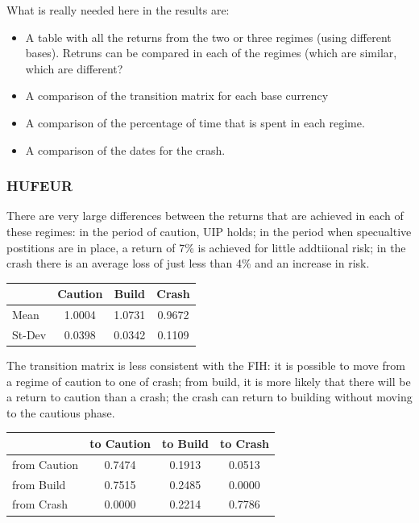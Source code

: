 \documentclass[12pt, a4paper, oneside]{article} %
\begin{document}
What is really needed here in the results are:
\begin{itemize}
\item A table with all the returns from the two or three regimes (using different bases).  Retruns can be compared in each of the regimes (which are similar, which are different? 
\item A comparison of the transition matrix for each base currency
\item A comparison of the percentage of time that is spent in each regime. 
\item A comparison of the dates for the crash. 
\end{itemize}
 
  
\subsubsection{HUFEUR}
There are very large differences between the returns that are achieved in each of these regimes: in the period of caution, UIP holds; in the period when specualtive postitions are in place, a return of 7\% is achieved for little addtiional risk; in the crash there is an average loss of just less than 4\% and an increase in risk. 

\begin{centering}
 \begin{tabular}{l c c c}
 & Caution & Build & Crash \\
 \hline
 Mean & 1.0004 & 1.0731 & 0.9672\\
 St-Dev & 0.0398 & 0.0342 & 0.1109\\
 \end{tabular}
 \end{centering}

The transition matrix is less consistent with the FIH:  it is possible to move from a regime of caution to one of crash; from build, it is more likely that there will be a return to caution than a crash; the crash can return to building without moving to the cautious phase.   

 \begin{centering}
 \begin{tabular}{l c c c}
 & to Caution & to Build & to Crash\\
 \hline
 from Caution & 0.7474 & 0.1913 & 0.0513\\
 from Build & 0.7515 & 0.2485 & 0.0000\\
 from Crash & 0.0000 & 0.2214 & 0.7786
 \end{tabular}
 \end{centering}
\end{document}
